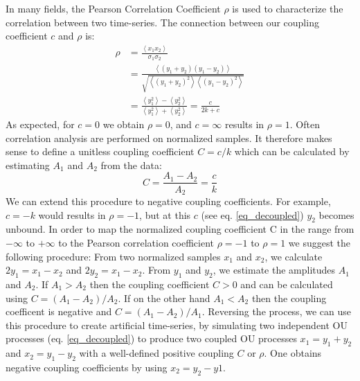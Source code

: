 \documentclass[%
 reprint,
 amsmath,amssymb,
 aps,
]{revtex4-1}
\begin{document}
In many fields, the Pearson Correlation Coefficient $\rho$ is used to characterize the correlation between two time-series.  The connection between our coupling coefficient $c$ and $\rho$ is:
\begin{equation}
	\begin{aligned}
	\rho &= \frac{\left<x_{1}x_{2}\right>}{\sigma_{1}\sigma_{2}}\\ &=\frac{\left<(y_{1}+y_{2})(y_{1}-y_{2})\right>}{\sqrt{\left<(y_{1}+y_{2})^{2}\right>\left<(y_{1}-y_{2})^{2}\right>}} \\ &=\frac{\left<y_{1}^{2}\right>-\left<y_{2}^{2}\right>}{\left<y_{1}^{2}\right>+\left<y_{2}^{2}\right>} = \frac{c}{2k+c}
	\end{aligned}
\end{equation}
As expected, for $c=0$ we obtain $\rho=0$, and $c=\infty$ results in $\rho=1$. Often correlation analysis are performed on normalized samples.  It therefore makes sense to define a unitless coupling coefficient $C=c/k$  which can be calculated by estimating $A_1$ and $A_2$ from the data:
\begin{equation}\label{Crho}
	C = \frac{A_{1}-A_{2}}{A_{2}}=\frac{c}{k}
\end{equation}
We can extend this procedure to negative coupling coefficients.  For example, $c=-k$ would results in $\rho=-1$, but at this $c$ (see eq. \ref{eq_decoupled}) $y_2$ becomes unbound.  In order to map the normalized coupling coefficient C in the range from $-\infty$ to $+\infty$ to the Pearson correlation coefficient $\rho=-1$ to $\rho=1$ we suggest the following procedure:  From two normalized samples $x_1$ and $x_2$, we calculate $2y_{1}=x_{1}-x_{2}$ and $2y_{2}=x_{1}-x_{2}$.  From $y_1$ and $y_2$, we estimate the amplitudes $A_{1}$ and $A_{2}$.  If $A_{1}>A_{2}$ then the coupling coefficient $C>0$ and can be calculated using $C=(A_{1}-A_{2})/A_{2}$.  If on the other hand $A_{1}<A_{2}$ then the coupling coefficent is negative and $C=(A_{1}-A_{2})/A_{1}$.  Reversing the process, we can use this procedure to create artificial time-series, by simulating two independent OU processes (eq. \ref{eq_decoupled}) to produce two coupled OU processes $x_{1}=y_{1}+y_{2}$ and $x_{2}=y_{1}-y_{2}$ with a well-defined positive coupling $C$ or $\rho$.  One obtains negative coupling coefficients by using $x_{2}=y_{2}-y{1}$.
\end{document}
